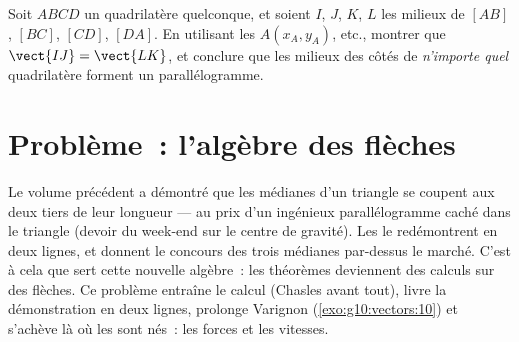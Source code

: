 \begin{exercise}[$\star\star\star$]\label{exo:g10:vectors:10}
Soit $ABCD$ un quadrilatère quelconque, et soient $I$, $J$, $K$, $L$
les milieux de $[AB]$, $[BC]$, $[CD]$, $[DA]$. En utilisant les
 $A(x_A, y_A)$, etc., montrer que $\vect{IJ} = \vect{LK}$,
et conclure que les milieux des côtés de \emph{n'importe quel}
quadrilatère forment un parallélogramme.
\end{exercise}

\section{Problème~: l'algèbre des flèches}

\begin{problem}
\label{pb:g10:vectors:1}
Le volume précédent a démontré que les médianes d'un triangle se
coupent aux deux tiers de leur longueur --- au prix d'un ingénieux
parallélogramme caché dans le triangle (devoir du week-end sur le
centre de gravité). Les  le redémontrent en deux lignes, et
donnent le concours des trois médianes par-dessus le marché. C'est à
cela que sert cette nouvelle algèbre~: les théorèmes deviennent des
calculs sur des flèches. Ce problème entraîne le calcul (Chasles
avant tout), livre la démonstration en deux lignes, prolonge Varignon
(\cref{exo:g10:vectors:10}) et s'achève là où les  sont nés~:
les forces et les vitesses.


\end{problem}
